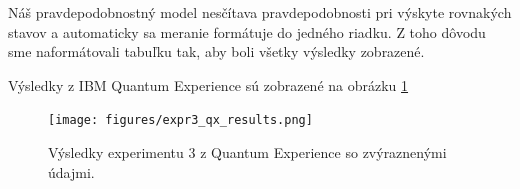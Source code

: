 Náš pravdepodobnostný model nesčítava pravdepodobnosti pri výskyte rovnakých 
stavov a automaticky sa meranie formátuje do jedného riadku. Z toho dôvodu sme 
naformátovali tabuľku tak, aby boli všetky výsledky zobrazené.

Výsledky z IBM Quantum Experience sú zobrazené na obrázku \ref{expr3_qx_results}

\begin{figure} 
	\centering 
	\texttt{[image: figures/expr3\_qx\_results.png]} 
	\caption{Výsledky experimentu 3 z Quantum Experience so zvýraznenými 
údajmi.}

    \label{expr3_qx_results}
\end{figure}
